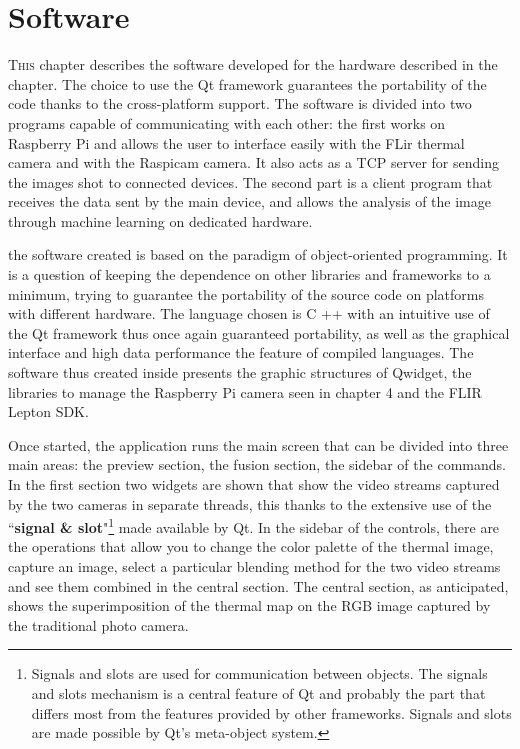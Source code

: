 \chapter{Software}
\label{chap:software}
%
\lettrine[lines=3]{T}{his} chapter describes the software developed for the
hardware described in the chapter. The choice to use the Qt framework guarantees
the portability of the code thanks to the cross-platform support. The software
is divided into two programs capable of communicating with each other: the first
works on Raspberry Pi and allows the user to interface easily with the FLir
thermal camera and with the Raspicam camera. It also acts as a TCP server for
sending the images shot to connected devices. The second part is a client
program that receives the data sent by the main device, and allows the analysis
of the image through machine learning on dedicated hardware.
%


%
the software created is based on the paradigm of object-oriented programming. It
is a question of keeping the dependence on other libraries and frameworks to a
minimum, trying to guarantee the portability of the source code on platforms
with different hardware. The language chosen is C ++ with an intuitive use of
the Qt framework thus once again guaranteed portability, as well as the
graphical interface and high data performance the feature of compiled languages.
The software thus created inside presents the graphic structures of Qwidget, the
libraries to manage the Raspberry Pi camera seen in chapter 4 and the FLIR
Lepton SDK.

Once started, the application runs the main screen that can be divided into
three main areas: the preview section, the fusion section, the sidebar of the
commands. In the first section two widgets are shown that show the video streams
captured by the two cameras in separate threads, this thanks to the extensive
use of the ``\textbf{signal \& slot}"\footnote{Signals and slots are used for
communication between objects. The signals and slots mechanism is a central
feature of Qt and probably the part that differs most from the features provided
by other frameworks. Signals and slots are made possible by Qt's meta-object
system.\cite{qtsignalslot}} made available by Qt. In the sidebar of the
controls, there are the operations that allow you to change the color palette of
the thermal image, capture an image, select a particular blending method for the
two video streams and see them combined in the central section. The central
section, as anticipated, shows the superimposition of the thermal map on the RGB
image captured by the traditional photo camera.


